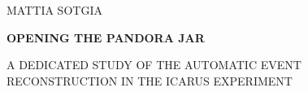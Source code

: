 \begin{titlepage}
    \ifdraft\BgThispage\fi
    \setlength{\parindent}{0pt}
    \color{white}

    \phantom{.}
    \vfill

    \dusffamily
    
    \fontsize{12}{12}\selectfont 
    MATTIA SOTGIA
    
    {
        \fontsize{45}{45}\selectfont
        \bfseries
        OPENING THE PANDORA JAR\par
        
        \vspace{1em}
        
        \fontsize{15}{25}\selectfont 
        A DEDICATED STUDY OF THE AUTOMATIC EVENT \\ RECONSTRUCTION IN THE ICARUS EXPERIMENT
    }
\end{titlepage}
